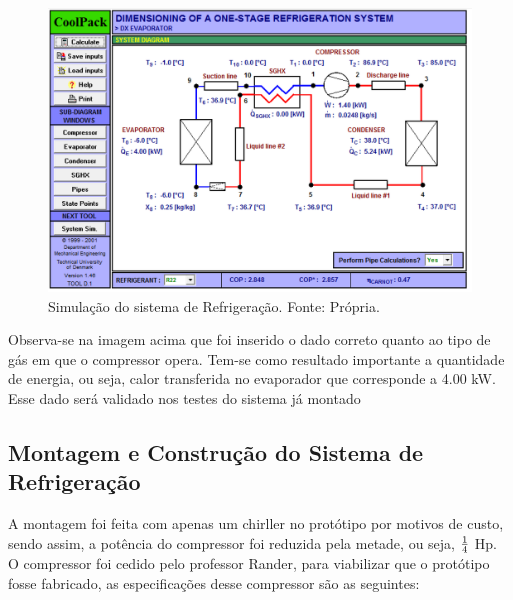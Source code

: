                 \begin{figure}[!htb]
            		\centering
            		\includegraphics[scale= 0.3]{figuras/simulacao-refrigeracao.png}
            		\caption{Simulação do sistema de Refrigeração. Fonte: Própria.}
            		\label{simulacao-refrigeracao}
            	\end{figure}

                Observa-se na imagem acima que foi inserido o dado correto quanto ao tipo de
                gás em que o compressor opera. Tem-se como resultado importante a quantidade
                de energia, ou seja, calor transferida no evaporador que corresponde a 4.00 kW.
                Esse dado será validado nos testes do sistema já montado


            \subsection[Montagem e Construção do Sistema de Refrigeração]{Montagem e Construção do Sistema de Refrigeração}
                A montagem foi feita com apenas um chirller no protótipo por motivos de custo,
                sendo assim, a potência do compressor foi reduzida pela metade, ou seja, $1 \over 4$ Hp.
                O compressor foi cedido pelo professor Rander, para viabilizar que o protótipo
                fosse fabricado, as especificações desse compressor são as seguintes:

